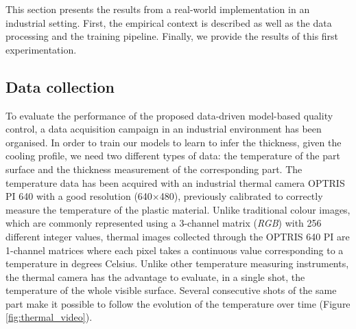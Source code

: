 This section presents the results from a real-world implementation in an industrial setting. First, the empirical context is described as well as the data processing and the training pipeline. Finally, we provide the results of this first experimentation.

\subsection{Data collection}

To evaluate the performance of the proposed data-driven model-based quality control, a data acquisition campaign in an industrial environment has been organised. In order to train our models to learn to infer the thickness, given the cooling profile, we need two different types of data: the temperature of the part surface and the thickness measurement of the corresponding part. The temperature data  has been acquired with an industrial thermal camera OPTRIS PI 640 with a good resolution (640$\times$480), previously calibrated to correctly measure the temperature of the plastic material. Unlike traditional colour images, which are commonly represented using a 3-channel matrix (\textit{RGB}) with 256 different integer values, thermal images collected through the OPTRIS 640 PI are 1-channel matrices where each pixel takes a continuous value corresponding to a temperature in degrees Celsius. Unlike other temperature measuring instruments, the thermal camera has the advantage to evaluate, in a single shot, the temperature of the whole visible surface. Several consecutive shots of the same part make it possible to follow the evolution of the temperature over time (Figure \ref{fig:thermal_video}). 

